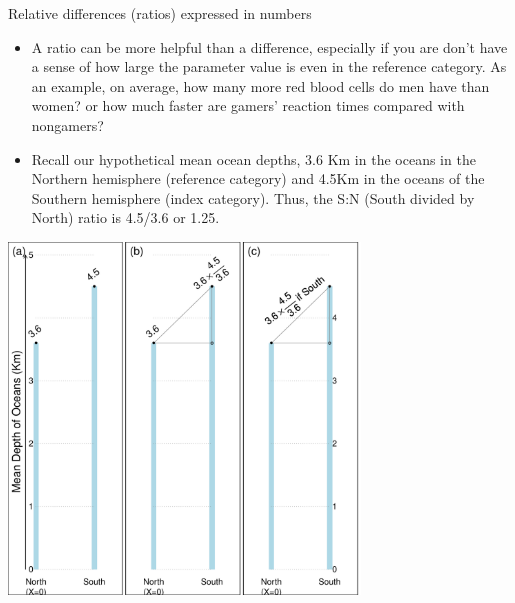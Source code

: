 \documentclass[10pt,handout]{beamer}\usepackage[]{graphicx}\usepackage[]{color}
\newenvironment{knitrout}{}{} %
\begin{document}
\begin{frame}{Relative differences (ratios) expressed in numbers}
	
	\begin{itemize}
		\item A ratio can be more helpful than a difference, especially if you are don't have a sense of how large the parameter value is even in the reference category. As an example, on average, how many more red blood cells do men have than women? or how much faster  are gamers' reaction times compared with nongamers? \pause 
		\item Recall our hypothetical mean ocean depths, 3.6 Km  in the oceans in the Northern hemisphere (reference category) and 4.5Km in the oceans of the Southern hemisphere (index category). Thus, the S:N (South divided by North) ratio is 4.5/3.6 or 1.25.
	\end{itemize}
\end{frame}	
	
	
	\begin{frame}
\begin{knitrout}\tiny
{}\color{fgcolor}

{\centering \includegraphics[width=0.7\textwidth]{figure/unnamed-chunk-3-1} 

}



\end{knitrout}
	\end{frame}
	
\end{document}
